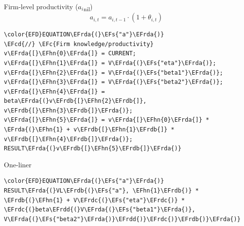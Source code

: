 \documentclass[bigger,aspectratio=169]{beamer}
\newcommand{\EFc}[1]{\textcolor{EFc}{#1}} %
\newcommand{\EFcd}[1]{\textcolor{EFcd}{#1}} %
\newcommand{\EFs}[1]{\textcolor{EFs}{#1}} %
\newcommand{\EFhn}[1]{\textcolor{EFhn}{\textbf{#1}}} %
\newcommand{\EFrda}[1]{\textcolor{EFrda}{#1}} %
\newcommand{\EFrdb}[1]{\textcolor{EFrdb}{#1}} %
\newcommand{\EFrdc}[1]{\textcolor{EFrdc}{#1}} %
\newcommand{\EFrdd}[1]{\textcolor{EFrdd}{#1}} %
\begin{document}
\begin{frame}[label={sec:org9f270d4},fragile]{Firm-level productivity (\(a_{i}\)\textsubscript{nil})}
 \begin{equation}
a_{i,t} = a_{i,t-1}\cdot (1 + \theta_{i,t})
\end{equation}


\begin{Code}
\begin{Verbatim}
\color{EFD}EQUATION\EFrda{(}\EFs{"a"}\EFrda{)}
\EFcd{//} \EFc{Firm knowledge/productivity}
v\EFrda{[}\EFhn{0}\EFrda{]} = CURRENT;
v\EFrda{[}\EFhn{1}\EFrda{]} = V\EFrda{(}\EFs{"eta"}\EFrda{)}; v\EFrda{[}\EFhn{2}\EFrda{]} = V\EFrda{(}\EFs{"beta1"}\EFrda{)}; v\EFrda{[}\EFhn{3}\EFrda{]} = V\EFrda{(}\EFs{"beta2"}\EFrda{)};
v\EFrda{[}\EFhn{4}\EFrda{]} = beta\EFrda{(}v\EFrdb{[}\EFhn{2}\EFrdb{]}, v\EFrdb{[}\EFhn{3}\EFrdb{]}\EFrda{)};
v\EFrda{[}\EFhn{5}\EFrda{]} = v\EFrda{[}\EFhn{0}\EFrda{]} * \EFrda{(}\EFhn{1} + v\EFrdb{[}\EFhn{1}\EFrdb{]} * v\EFrdb{[}\EFhn{4}\EFrdb{]}\EFrda{)};
RESULT\EFrda{(}v\EFrdb{[}\EFhn{5}\EFrdb{]}\EFrda{)}
\end{Verbatim}
\end{Code}
\begin{block}{One-liner}
\begin{Code}
\begin{Verbatim}
\color{EFD}EQUATION\EFrda{(}\EFs{"a"}\EFrda{)}
RESULT\EFrda{(}VL\EFrdb{(}\EFs{"a"}, \EFhn{1}\EFrdb{)} * \EFrdb{(}\EFhn{1} + V\EFrdc{(}\EFs{"eta"}\EFrdc{)} * \EFrdc{(}beta\EFrdd{(}V\EFrda{(}\EFs{"beta1"}\EFrda{)}, V\EFrda{(}\EFs{"beta2"}\EFrda{)}\EFrdd{)}\EFrdc{)}\EFrdb{)}\EFrda{)}
\end{Verbatim}
\end{Code}
\end{block}
\end{frame}
\end{document}
